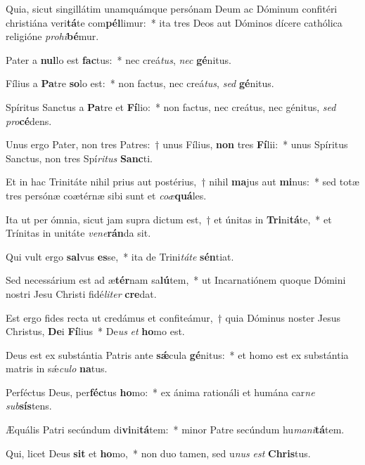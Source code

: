 \item Quia, sicut singillátim unamquámque persónam Deum ac Dóminum confitéri christiána veri\textbf{tá}te com\textbf{pél}limur:~* ita tres Deos aut Dóminos dícere cathólica religióne \textit{pro}\textit{hi}\textbf{bé}mur.
\item Pater a \textbf{nul}lo est \textbf{fac}tus:~* nec creá\textit{tus}, \textit{nec} \textbf{gé}nitus.
\item Fílius a \textbf{Pa}tre \textbf{so}lo est:~* non factus, nec creá\textit{tus}, \textit{sed} \textbf{gé}nitus.
\item Spíritus Sanctus a \textbf{Pa}tre et \textbf{Fí}lio:~* non factus, nec creátus, nec génitus, \textit{sed} \textit{pro}\textbf{cé}dens.
\item Unus ergo Pater, non tres Patres:~† unus Fílius, \textbf{non} tres \textbf{Fí}lii:~* unus Spíritus Sanctus, non tres Spí\textit{ri}\textit{tus} \textbf{Sanc}ti.
\item Et in hac Trinitáte nihil prius aut postérius,~† nihil \textbf{ma}jus aut \textbf{mi}nus:~* sed totæ tres persónæ coætérnæ sibi sunt et \textit{co}\textit{æ}\textbf{quá}les.
\item Ita ut per ómnia, sicut jam supra dictum est,~† et únitas in \textbf{Tri}ni\textbf{tá}te,~* et Trínitas in unitáte \textit{ve}\textit{ne}\textbf{rán}da sit.
\item Qui vult ergo \textbf{sal}vus \textbf{es}se,~* ita de Trini\textit{tá}\textit{te} \textbf{sén}tiat.
\item Sed necessárium est ad æ\textbf{tér}nam sa\textbf{lú}tem,~* ut Incarnatiónem quoque Dómini nostri Jesu Christi fidé\textit{li}\textit{ter} \textbf{cre}dat.
\item Est ergo fides recta ut credámus et confiteámur,~† quia Dóminus noster Jesus Christus, \textbf{De}i \textbf{Fí}lius~* De\textit{us} \textit{et} \textbf{ho}mo est.
\item Deus est ex substántia Patris ante \textbf{sǽ}cula \textbf{gé}nitus:~* et homo est ex substántia matris in sǽ\textit{cu}\textit{lo} \textbf{na}tus.
\item Perféctus Deus, per\textbf{féc}tus \textbf{ho}mo:~* ex ánima rationáli et humána car\textit{ne} \textit{sub}\textbf{sís}tens.
\item Æquális Patri secúndum di\textbf{vi}ni\textbf{tá}tem:~* minor Patre secúndum hu\textit{ma}\textit{ni}\textbf{tá}tem.
\item Qui, licet Deus \textbf{sit} et \textbf{ho}mo,~* non duo tamen, sed u\textit{nus} \textit{est} \textbf{Chris}tus.
